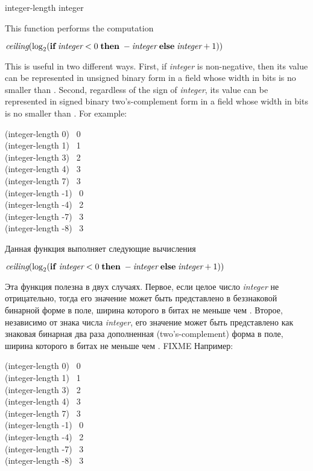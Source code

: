 \begin{defun}[Function]
integer-length integer

This function performs the computation
\begin{tabbing}
$ \emph{ceiling}(\log_2 (\textbf{if}\; \emph{integer} < 0 \;\textbf{then} \;
    -\emph{integer} \;\textbf{else}\; \emph{integer}+1)) $
\end{tabbing}
This is useful in two different ways.
First, if \emph{integer} is non-negative, then its value can be represented
in unsigned binary form in a field whose width in bits is
no smaller than .
Second, regardless of the sign of \emph{integer}, its value can be
represented in signed binary two's-complement form in a field
whose width in bits is no smaller than .
For example:
\begin{lisp}
(integer-length 0) \EV\ 0 \\
(integer-length 1) \EV\ 1 \\
(integer-length 3) \EV\ 2 \\
(integer-length 4) \EV\ 3 \\
(integer-length 7) \EV\ 3 \\
(integer-length -1) \EV\ 0 \\
(integer-length -4) \EV\ 2 \\
(integer-length -7) \EV\ 3 \\
(integer-length -8) \EV\ 3
\end{lisp}

Данная функция выполняет следующие вычисления
\begin{tabbing}
$ \emph{ceiling}(\log_2 ({\bf if}\; \emph{integer} < 0 \;{\bf then} \;
    -\emph{integer} \;{\bf else}\; \emph{integer}+1)) $
\end{tabbing}
Эта функция полезна в двух случаях.
Первое, если целое число \emph{integer} не отрицательно, тогда его значение
может быть представлено в беззнаковой бинарной форме в поле, ширина которого в
битах не меньше чем .
Второе, независимо от знака числа \emph{integer}, его значение может быть
представлено как знаковая бинарная два раза дополненная (two's-complement) форма
в поле, ширина которого в битах не меньше чем
 . FIXME
Например:
\begin{lisp}
(integer-length 0) \EV\ 0 \\
(integer-length 1) \EV\ 1 \\
(integer-length 3) \EV\ 2 \\
(integer-length 4) \EV\ 3 \\
(integer-length 7) \EV\ 3 \\
(integer-length -1) \EV\ 0 \\
(integer-length -4) \EV\ 2 \\
(integer-length -7) \EV\ 3 \\
(integer-length -8) \EV\ 3
\end{lisp}
\end{defun}


